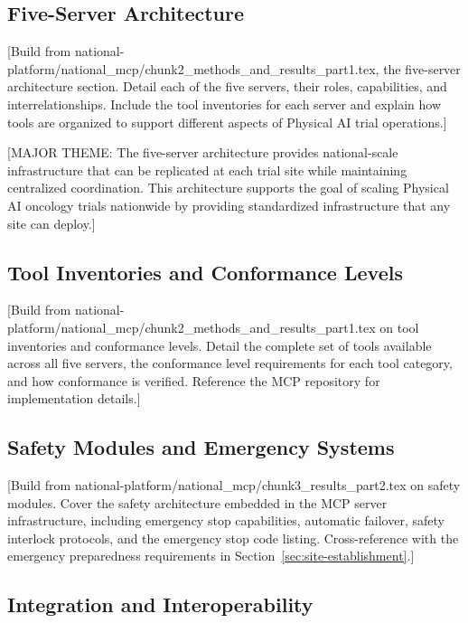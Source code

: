 \subsection{Five-Server Architecture}
\label{subsec:mcp-architecture}

[Build from national-platform/national\_mcp/chunk2\_methods\_and\_results\_part1.tex,
the five-server architecture section. Detail each of the five servers, their
roles, capabilities, and interrelationships. Include the tool inventories for
each server and explain how tools are organized to support different aspects of
Physical AI trial operations.]

[MAJOR THEME: The five-server architecture provides national-scale
infrastructure that can be replicated at each trial site while maintaining
centralized coordination. This architecture supports the goal of scaling
Physical AI oncology trials nationwide by providing standardized infrastructure
that any site can deploy.]

\subsection{Tool Inventories and Conformance Levels}
\label{subsec:mcp-tools}

[Build from national-platform/national\_mcp/chunk2\_methods\_and\_results\_part1.tex
on tool inventories and conformance levels. Detail the complete set of tools
available across all five servers, the conformance level requirements for each
tool category, and how conformance is verified. Reference the MCP repository
\cite{mcp-repo} for implementation details.]

\subsection{Safety Modules and Emergency Systems}
\label{subsec:mcp-safety}

[Build from national-platform/national\_mcp/chunk3\_results\_part2.tex on
safety modules. Cover the safety architecture embedded in the MCP server
infrastructure, including emergency stop capabilities, automatic failover,
safety interlock protocols, and the emergency stop code listing. Cross-reference
with the emergency preparedness requirements in
Section~\ref{sec:site-establishment}.]

\subsection{Integration and Interoperability}
\label{subsec:mcp-integration}

